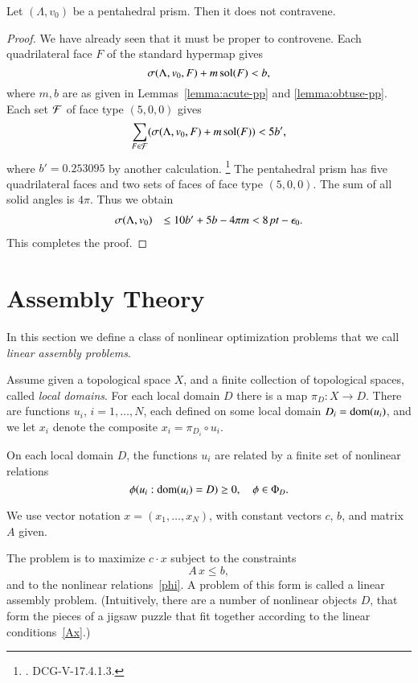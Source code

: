 \begin{lemma}
Let $(\Lambda,v_0)$ be a pentahedral prism.  Then it does not
contravene.
\end{lemma}

\begin{proof} We have already seen that it must be proper to
controvene.  Each quadrilateral face $F$ of the standard hypermap
gives
   $$\sigma(\Lambda,v_0,F) + m\operatorname{sol}(F) < b,$$
where $m,b$ are as given in Lemmas~\ref{lemma:acute-pp} and 
\ref{lemma:obtuse-pp}.  Each set ${\mathcal F}$ of face type $(5,0,0)$ gives
   $$
   \sum_{F\in{\mathcal F}}(\sigma(\Lambda,v_0,F) + m\operatorname{sol}(F)) < 5 b',
   $$
where $b'= 0.253095$ by another calculation.%
\footnote{.  DCG-V-17.4.1.3.}
The pentahedral prism has five quadrilateral faces and two sets
of faces of face type $(5,0,0)$.  The sum of all solid angles is $4\pi$.
Thus we obtain
   $$
   \begin{array}{lll}
   \sigma(\Lambda,v_0) &\le 10 b' + 5 b - 4\pi m < 8\,\hbox{\it pt} -\epsilon_0.
   \end{array}
   $$
This completes the proof.
\end{proof}

\section{Assembly Theory} \label{linear}




In this section we define a class of nonlinear optimization
problems that we call {\it linear assembly problems}.

Assume given a topological space $X$, and a finite collection of
topological spaces, called {\it local domains}.  For each local
domain $D$ there is a map $\pi_D:X\to D$.  There are functions
$u_i$, $i=1,\ldots,N$, each defined on some local domain $D_i =
{\operatorname{dom}}(u_i)$, and we let $x_i$ denote the composite $x_i =
\pi_{D_i}\circ u_i$.

On each local domain $D$, the functions $u_i$ are related by a
finite set of nonlinear relations
\begin{equation}\phi(u_i : {\operatorname{dom}}(u_i) = D) \ge0, \quad \phi \in \Phi_D.
    \label{phi}
\end{equation}

We use vector notation $x = (x_1,\ldots,x_N)$, with constant
vectors $c$, $b$, and matrix $A$ given.

The problem is to maximize $c\cdot x$ subject to the constraints
    \begin{equation}\label{Ax}A\, x \le b,
    \end{equation}
and to the nonlinear relations~\ref{phi}.  A problem of this form
is called a linear assembly problem.  (Intuitively, there are a
number of nonlinear objects $D$, that form the pieces of a jigsaw
puzzle that fit together according to the linear
conditions~\ref{Ax}.)

